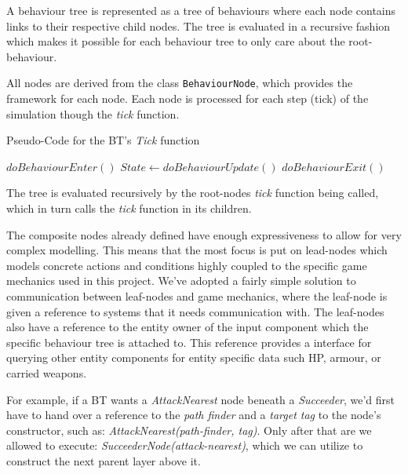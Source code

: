 \documentclass[a4paper, twocolumn]{article}
\begin{document}
        A behaviour tree is represented as a tree of behaviours where each node contains links to their respective child nodes. The tree is evaluated in a recursive fashion which makes it possible for each behaviour tree to only care about the root-behaviour.

        All nodes are derived from the class \texttt{BehaviourNode}, which provides the framework for each node. Each node is processed for each step (tick) of the simulation though the \emph{tick} function.

        \begin{algorithm}[H]
            \caption{Pseudo-Code for the BT's \emph{Tick} function}
            \label{alg:behaviour_tree_update}
            \begin{algorithmic}
                    \STATE \(doBehaviourEnter()\)
                \ENDIF
                \STATE \(State \leftarrow doBehaviourUpdate()\)
                    \STATE \(doBehaviourExit()\)
                \ENDIF
            \end{algorithmic}
        \end{algorithm}
        The tree is evaluated recursively by the root-nodes \emph{tick} function being called, which in turn calls the \emph{tick} function in its children.

        The composite nodes already defined have enough expressiveness to allow for very complex modelling. This means that the most focus is put on lead-nodes which models concrete actions and conditions highly coupled to the specific game mechanics used in this project. We've adopted a fairly simple solution to communication between leaf-nodes and game mechanics, where the leaf-node is given a reference to systems that it needs communication with. The leaf-nodes also have a reference to the entity owner of the input component which the specific behaviour tree is attached to. This reference provides a interface for querying other entity components for entity specific data such HP, armour, or carried weapons.

        For example, if a BT wants a \emph{AttackNearest} node beneath a \emph{Succeeder}, we'd first have to hand over a reference to the \emph{path finder} and a \emph{target tag} to the node's constructor, such as: \emph{AttackNearest(path-finder, tag)}. Only after that are we allowed to execute: \emph{SucceederNode(attack-nearest)}, which we can utilize to construct the next parent layer above it.
\end{document}
